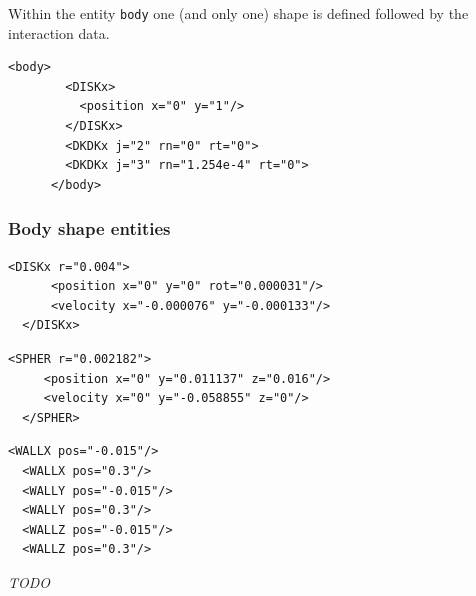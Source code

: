 \documentclass{simpledoc}
\newcommand{\screen}[1]{\texttt{#1}}
\begin{document}
Within the entity  \screen{body} one (and only one) shape is defined followed by the interaction data.

\begin{lstlisting}[style=mgpdata]
      <body>
        <DISKx>
          <position x="0" y="1"/>
        </DISKx>
        <DKDKx j="2" rn="0" rt="0">
        <DKDKx j="3" rn="1.254e-4" rt="0">
      </body>
\end{lstlisting}

\subsubsection{Body shape entities}


\begin{lstlisting}[style=mgpdata]
  <DISKx r="0.004">
      <position x="0" y="0" rot="0.000031"/>
      <velocity x="-0.000076" y="-0.000133"/>
  </DISKx>
\end{lstlisting}


\begin{lstlisting}[style=mgpdata]
  <SPHER r="0.002182">
     <position x="0" y="0.011137" z="0.016"/>
     <velocity x="0" y="-0.058855" z="0"/>
  </SPHER>
\end{lstlisting}

% 


\begin{lstlisting}[style=mgpdata]
  <WALLX pos="-0.015"/>
  <WALLX pos="0.3"/>
  <WALLY pos="-0.015"/>
  <WALLY pos="0.3"/>
  <WALLZ pos="-0.015"/>
  <WALLZ pos="0.3"/>
\end{lstlisting}





 \textit{TODO}
\end{document}
